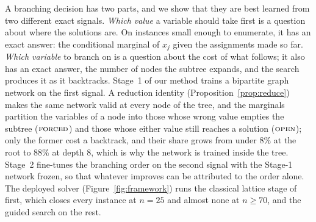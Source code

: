 \documentclass[final,5p,times,twocolumn,authoryear]{elsarticle}
\newcommand{\FORCED}{\textsc{forced}}
\newcommand{\FREE}{\textsc{open}}
\begin{document}
A branching decision has two parts, and we show that they are best learned from two different exact signals. \emph{Which value} a variable should take first is a question about where the solutions are. On instances small enough to enumerate, it has an exact answer: the conditional marginal of $x_j$ given the assignments made so far. \emph{Which variable} to branch on is a question about the cost of what follows; it also has an exact answer, the number of nodes the subtree expands, and the search produces it as it backtracks. Stage~1 of our method trains a bipartite graph network on the first signal. A reduction identity (Proposition~\ref{prop:reduce}) makes the same network valid at every node of the tree, and the marginals partition the variables of a node into those whose wrong value empties the subtree ($\FORCED$) and those whose either value still reaches a solution ($\FREE$); only the former cost a backtrack, and their share grows from under $8\%$ at the root to $88\%$ at depth $8$, which is why the network is trained inside the tree. Stage~2 fine-tunes the branching order on the second signal with the Stage-1 network frozen, so that whatever improves can be attributed to the order alone. The deployed solver (Figure~\ref{fig:framework}) runs the classical lattice stage of \citet{aardal2000diophantine} first, which closes every instance at $n=25$ and almost none at $n\ge70$, and the guided search on the rest.
\end{document}
